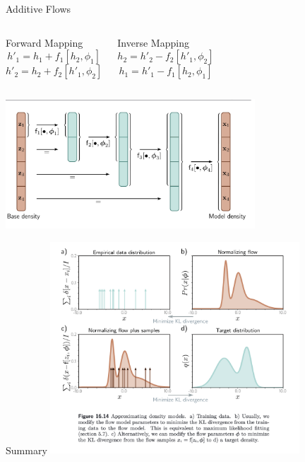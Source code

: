 \documentclass[aspectratio=169,xcolor=dvipsnames]{beamer}
\begin{document}
\begin{frame}{Additive Flows}
\begin{columns}[T,onlytextwidth]
  \begin{block}{Forward Mapping}
    \[
    h'_1 = h_1 + f_1[h_2, \phi_1]
    \]
    \[
    h'_2 = h_2 + f_2[h'_1, \phi_2]
    \]
  \end{block}

  \begin{block}{Inverse Mapping}
    \[
    h_2 = h'_2 - f_2[h'_1, \phi_2]
    \]
    \[
    h_1 = h'_1 - f_1[h_2, \phi_1]
    \]
  \end{block}
\end{columns}
\vspace{0.5cm}
\begin{center}
  \includegraphics[width=0.7\textwidth]{pictures/multiscale.png}
\end{center}
\end{frame}



\begin{frame}{Summary}
  \centering
  \includegraphics[width=0.7\textwidth]{pictures/Summary.png}\\[0.5cm]
\end{frame}
\end{document}

